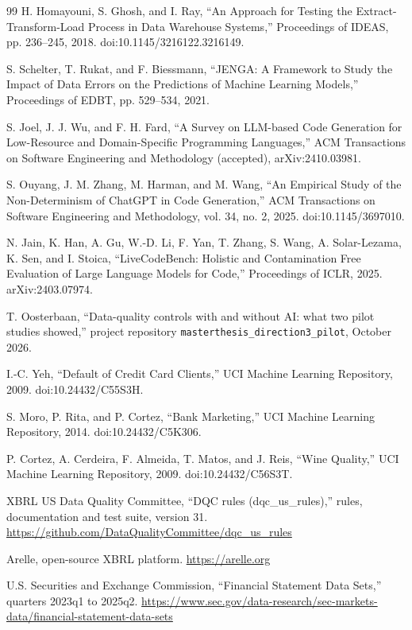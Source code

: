\documentclass[11pt,a4paper]{article}
\begin{document}
\begin{thebibliography}{99}
 H. Homayouni, S. Ghosh, and I. Ray, ``An Approach for Testing the Extract-Transform-Load Process in Data Warehouse Systems,'' Proceedings of IDEAS, pp. 236--245, 2018. doi:10.1145/3216122.3216149.

 S. Schelter, T. Rukat, and F. Biessmann, ``JENGA: A Framework to Study the Impact of Data Errors on the Predictions of Machine Learning Models,'' Proceedings of EDBT, pp. 529--534, 2021.

 S. Joel, J. J. Wu, and F. H. Fard, ``A Survey on LLM-based Code Generation for Low-Resource and Domain-Specific Programming Languages,'' ACM Transactions on Software Engineering and Methodology (accepted), arXiv:2410.03981.

 S. Ouyang, J. M. Zhang, M. Harman, and M. Wang, ``An Empirical Study of the Non-Determinism of ChatGPT in Code Generation,'' ACM Transactions on Software Engineering and Methodology, vol. 34, no. 2, 2025. doi:10.1145/3697010.

 N. Jain, K. Han, A. Gu, W.-D. Li, F. Yan, T. Zhang, S. Wang, A. Solar-Lezama, K. Sen, and I. Stoica, ``LiveCodeBench: Holistic and Contamination Free Evaluation of Large Language Models for Code,'' Proceedings of ICLR, 2025. arXiv:2403.07974.

 T. Oosterbaan, ``Data-quality controls with and without AI: what two pilot studies showed,'' project repository \texttt{masterthesis\_direction3\_pilot}, October 2026.

 I.-C. Yeh, ``Default of Credit Card Clients,'' UCI Machine Learning Repository, 2009. doi:10.24432/C55S3H.

 S. Moro, P. Rita, and P. Cortez, ``Bank Marketing,'' UCI Machine Learning Repository, 2014. doi:10.24432/C5K306.

 P. Cortez, A. Cerdeira, F. Almeida, T. Matos, and J. Reis, ``Wine Quality,'' UCI Machine Learning Repository, 2009. doi:10.24432/C56S3T.

 XBRL US Data Quality Committee, ``DQC rules (dqc\_us\_rules),'' rules, documentation and test suite, version 31. \url{https://github.com/DataQualityCommittee/dqc_us_rules}

 Arelle, open-source XBRL platform. \url{https://arelle.org}

 U.S. Securities and Exchange Commission, ``Financial Statement Data Sets,'' quarters 2023q1 to 2025q2. \url{https://www.sec.gov/data-research/sec-markets-data/financial-statement-data-sets}


\end{thebibliography}
\end{document}
